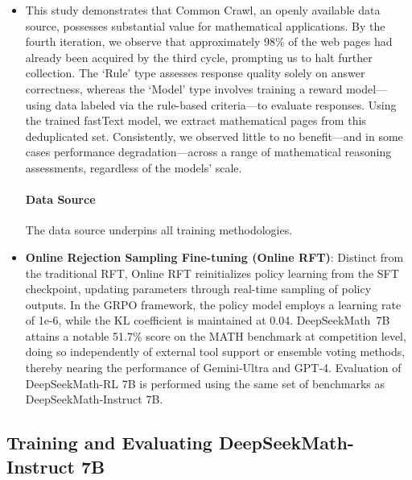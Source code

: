 \begin{itemize}[topsep=0pt]
    \item This study demonstrates that Common Crawl, an openly available data source, possesses substantial value for mathematical applications. By the fourth iteration, we observe that approximately 98\% of the web pages had already been acquired by the third cycle, prompting us to halt further collection. The `Rule' type assesses response quality solely on answer correctness, whereas the `Model' type involves training a reward model—using data labeled via the rule-based criteria—to evaluate responses. Using the trained fastText model, we extract mathematical pages from this deduplicated set. Consistently, we observed little to no benefit—and in some cases performance degradation—across a range of mathematical reasoning assessments, regardless of the models’ scale. \paragraph{Data Source} The data source underpins all training methodologies. \item \textbf{Online Rejection Sampling Fine-tuning (Online RFT)}: Distinct from the traditional RFT, Online RFT reinitializes policy learning from the SFT checkpoint, updating parameters through real-time sampling of policy outputs. In the GRPO framework, the policy model employs a learning rate of 1e-6, while the KL coefficient is maintained at 0.04. DeepSeekMath~7B attains a notable 51.7\% score on the MATH benchmark at competition level, doing so independently of external tool support or ensemble voting methods, thereby nearing the performance of Gemini-Ultra and GPT-4. Evaluation of DeepSeekMath-RL 7B is performed using the same set of benchmarks as DeepSeekMath-Instruct 7B. \end{itemize}

\subsection{Training and Evaluating DeepSeekMath-Instruct 7B}

